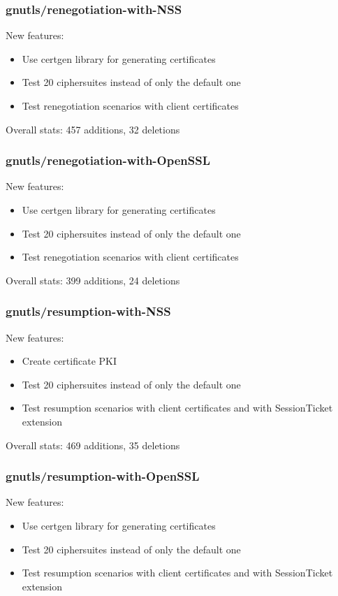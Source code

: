\subsubsection{gnutls/renegotiation-with-NSS}
    New features:
    \begin{itemize}
        \item Use certgen library for generating certificates
        \item Test 20 ciphersuites instead of only the default one
        \item Test renegotiation scenarios with client certificates
    \end{itemize}

    Overall stats: 457 additions, 32 deletions

\subsubsection{gnutls/renegotiation-with-OpenSSL}
    New features:
    \begin{itemize}
        \item Use certgen library for generating certificates
        \item Test 20 ciphersuites instead of only the default one
        \item Test renegotiation scenarios with client certificates
    \end{itemize}

    Overall stats: 399 additions, 24 deletions

\subsubsection{gnutls/resumption-with-NSS}
    New features:
    \begin{itemize}
        \item Create certificate PKI
        \item Test 20 ciphersuites instead of only the default one
        \item Test resumption scenarios with client certificates and with
            SessionTicket extension
    \end{itemize}

    Overall stats: 469 additions, 35 deletions

\subsubsection{gnutls/resumption-with-OpenSSL}
    New features:
    \begin{itemize}
        \item Use certgen library for generating certificates
        \item Test 20 ciphersuites instead of only the default one
        \item Test resumption scenarios with client certificates and with
            SessionTicket extension
    \end{itemize}

